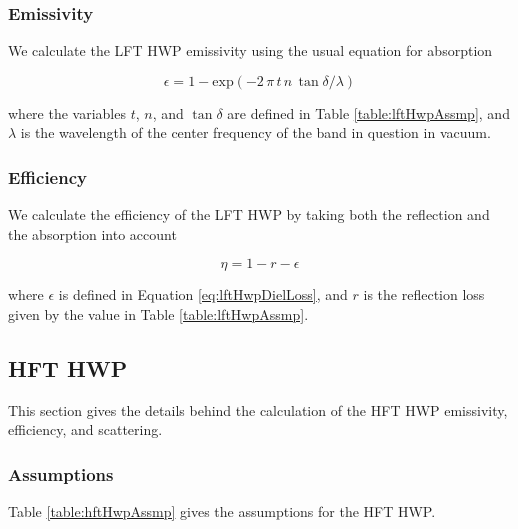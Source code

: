 \documentclass[12pt, titlepage]{article} %
\begin{document}

\subsubsection{Emissivity}

We calculate the LFT HWP emissivity using the usual equation for absorption \cite{lamb}

\begin{equation}
	\epsilon = 1 - \mathrm{exp} (- 2 \, \pi \, t \, n \, \tan{\delta} / \lambda )
	\label{eq:lftHwpDielLoss}
\end{equation}

where the variables $t$, $n$, and $\tan{\delta}$ are defined in Table \ref{table:lftHwpAssmp}, and $\lambda$ is the wavelength of the center frequency of the band in question in vacuum. 


\subsubsection{Efficiency}

We calculate the efficiency of the LFT HWP by taking both the reflection and the absorption into account

\begin{equation}
	\eta = 1 - r - \epsilon
\end{equation}

where $\epsilon$ is defined in Equation \ref{eq:lftHwpDielLoss}, and $r$ is the reflection loss given by the value in Table \ref{table:lftHwpAssmp}.


\subsection{HFT HWP}

This section gives the details behind the calculation of the HFT HWP emissivity, efficiency, and scattering.


\subsubsection{Assumptions}

Table \ref{table:hftHwpAssmp} gives the assumptions for the HFT HWP.
\end{document}
